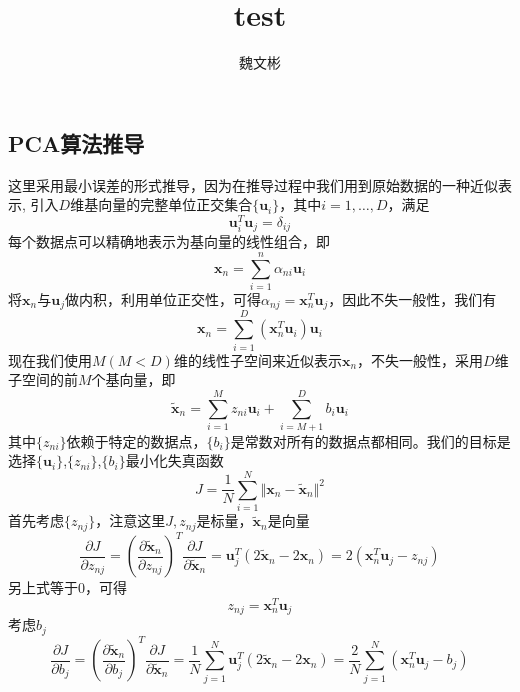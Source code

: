 \documentclass[UTF8,12pt]{ctexart}
\title{test}
\author{魏文彬}
\begin{document}
\subsection*{PCA算法推导}
这里采用最小误差的形式推导，因为在推导过程中我们用到原始数据的一种近似表示,
引入$D$维基向量的完整单位正交集合$\{\bm{u}_i\}$，其中$i=1,\dots,D$，满足
\begin{equation}
	\bm{u}_i^T\bm{u}_j=\delta_{ij}
\end{equation}
每个数据点可以精确地表示为基向量的线性组合，即
\begin{equation}
    \bm{x}_n=\sum_{i=1}^n \alpha_{ni} \bm{u}_i
\end{equation}
将$\bm{x}_n$与$\bm{u}_j$做内积，利用单位正交性，可得$\alpha_{nj}=\bm{x}_n^T\bm{u}_j$，因此不失一般性，我们有
\begin{equation}
    \bm{x}_n=\sum_{i=1}^D(\bm{x}_n^T\bm{u}_i)\bm{u}_i
\end{equation}
现在我们使用$M(M<D)$维的线性子空间来近似表示$\bm{x}_n$，不失一般性，采用$D$维子空间的前$M$个基向量，即
\begin{equation}
    \tilde{\bm{x}}_n=\sum_{i=1}^M z_{ni}\bm{u}_i+\sum_{i=M+1}^D b_i\bm{u}_i
\end{equation}
其中$\{z_{ni}\}$依赖于特定的数据点，$\{b_i\}$是常数对所有的数据点都相同。我们的目标是选择$\{\bm{u}_i\}$,$\{z_{ni}\}$,$\{b_i\}$最小化失真函数
\begin{equation}
    J=\frac{1}{N}\sum_{i=1}^N \Vert \bm{x}_n-\tilde{\bm{x}}_n\Vert^2
\end{equation}
首先考虑$\{z_{nj}\}$，注意这里$J,z_{nj}$是标量，$\tilde{\bm{x}}_n$是向量
\begin{equation}
\frac{\partial J}{\partial z_{nj}} = (\frac{\partial \tilde{\bm{x}}_n}{\partial z_{nj}})^T \frac{\partial J}{\partial \tilde{\bm{x}}_n} 
= \bm{u}_j^T(2\tilde{\bm{x}}_n-2\bm{x}_n)
=2(\bm{x}_n^T \bm{u}_j-z_{nj})
\end{equation}
另上式等于0，可得
\begin{equation}
    z_{nj} = \bm{x}_n^T\bm{u}_j
\end{equation}
考虑$b_j$
\begin{equation}
\frac{\partial J}{\partial b_j} = (\frac{\partial \tilde{\bm{x}}_n}{\partial b_j})^T \frac{\partial J}{\partial \tilde{\bm{x}}_n} 
=\frac{1}{N} \sum_{j=1}^N \bm{u}_j^T(2\tilde{\bm{x}}_n-2\bm{x}_n)
=\frac{2}{N}\sum_{j=1}^N (\bm{x}_n^T \bm{u}_j-b_j)
\end{equation}
\end{document}

